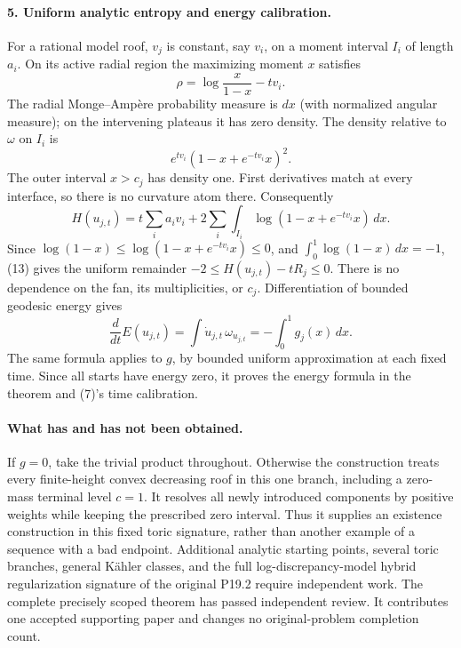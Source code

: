 \documentclass[11pt]{article}
\begin{document}
\paragraph{5. Uniform analytic entropy and energy calibration.}
For a rational model roof, $v_j$ is constant, say $v_i$, on a
moment interval $I_i$ of length $a_i$. On its active radial region
the maximizing moment $x$ satisfies
\[
 \rho=\log\frac{x}{1-x}-t v_i.
\]
The radial Monge--Amp\`ere probability measure is $dx$ (with normalized
angular measure); on the intervening plateaus it has zero density.
The density relative to $\omega$ on $I_i$ is
\[
 e^{t v_i}(1-x+e^{-t v_i}x)^2.
\]
The outer interval $x>c_j$ has density one. First derivatives
match at every interface, so there is no curvature atom there.
Consequently
\[
 H(u_{j,t})=t\sum_i a_i v_i
    +2\sum_i\int_{I_i}\log(1-x+e^{-t v_i}x)\,dx.          \tag{13}
\]
Since $\log(1-x)\le\log(1-x+e^{-t v_i}x)\le0$,
and $\int_0^1\log(1-x)\,dx=-1$, (13) gives the uniform
remainder $-2\le H(u_{j,t})-tR_j\le0$.
There is no dependence on the fan, its multiplicities, or $c_j$.
Differentiation of bounded geodesic energy gives
\[
 \frac{d}{dt}E(u_{j,t})=
 \int\dot u_{j,t}\,\omega_{u_{j,t}}=-\int_0^1g_j(x)\,dx.
\]
The same formula applies to $g$, by bounded uniform approximation
at each fixed time. Since all starts have energy zero, it proves
the energy formula in the theorem and (7)'s time calibration.

\paragraph{What has and has not been obtained.}
If $g=0$, take the trivial product throughout. Otherwise the
construction treats every finite-height convex decreasing roof in
this one branch, including a zero-mass terminal level $c=1$.
It resolves all newly introduced components by positive weights
while keeping the prescribed zero interval. Thus it supplies an
existence construction in this fixed toric signature, rather than
another example of a sequence with a bad endpoint. Additional
analytic starting points, several toric branches, general K\"ahler
classes, and the full log-discrepancy-model hybrid regularization
signature of the original P19.2 require independent work.
The complete precisely scoped theorem has passed independent review.
It contributes one accepted supporting paper and changes no
original-problem completion count.
\end{document}
